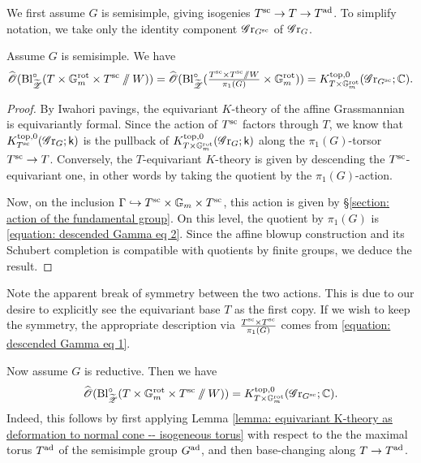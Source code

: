 We first assume $G$ is semisimple, giving isogenies $T^{\sc} \to T \to T^{\ad}$. To simplify notation, we take only the identity component $\Gr_{G^{\sc}}$ of $\Gr_G$. 
\begin{lemma}\label{lemma: equivariant K-theory as deformation to normal cone -- isogeneous torus}
Assume $G$ is semisimple. We have 
\begin{equation*}
    \widehat{\O}(\Bl^{\circ}_{\widetilde{\eZ}}(T \times \Gm^{\rot} \times T^{\sc}\sslash W ))
    =\widehat{\O}(\Bl^{\circ}_{\widetilde{\eZ}}(\tfrac{T^{\sc} \times T^{\sc} \sslash W}{\pi_1(G)} \times \Gm^{\rot}))
    =K^{\top, 0}_{T \times \Gm^{\rot}}(\Gr_{G^{\sc}}; \C).
\end{equation*}
\end{lemma}
\begin{proof}
By Iwahori pavings, the equivariant $K$-theory of the affine Grassmannian is equivariantly formal. Since the action of $T^{\sc}$ factors through $T$, we know that $K^{\top, 0}_{T^{\sc}}(\Gr_G; \k)$ is the pullback of $K^{\top, 0}_{T \times \Gm^{\rot}}(\Gr_G; \k)$ along the $\pi_1(G)$-torsor $T^{\sc} \to T$. Conversely, the $T$-equivariant $K$-theory is given by descending the $T^{\sc}$-equivariant one, in other words by taking the quotient by the $\pi_1(G)$-action.

Now, on the inclusion $\Gamma \hookrightarrow T^{\sc} \times \Gm \times T^{\sc}$, this action is given by \S \ref{section: action of the fundamental group}. On this level, the quotient by $\pi_1(G)$ is \eqref{equation: descended Gamma eq 2}. Since the affine blowup construction and its Schubert completion is compatible with quotients by finite groups, we deduce the result.    
\end{proof}

\begin{remark}
Note the apparent break of symmetry between the two actions. This is due to our desire to explicitly see the equivariant base $T$ as the first copy. If we wish to keep the symmetry, the appropriate description via $\tfrac{T^{\sc} \times T^{\sc}}{\pi_1(G)}$ comes from \eqref{equation: descended Gamma eq 1}.
\end{remark}


\begin{remark}\label{remark: equivariant K-theory as deformation to normal cone -- isogeneous torus}
Now assume $G$ is reductive. Then we have
\begin{equation*}
\widehat{\O}(\Bl^{\circ}_{\widetilde{\eZ}}(T \times \Gm^{\rot} \times T^{\sc}\sslash W ))
=K^{\top, 0}_{T \times \Gm^{\rot}}(\Gr_{G^{\sc}}; \C).    
\end{equation*}
Indeed, this follows by first applying Lemma \ref{lemma: equivariant K-theory as deformation to normal cone -- isogeneous torus} with respect to the the maximal torus $T^{\ad}$ of the semisimple group $G^{\ad}$, and then base-changing along $T \to T^{\ad}$.
\end{remark}